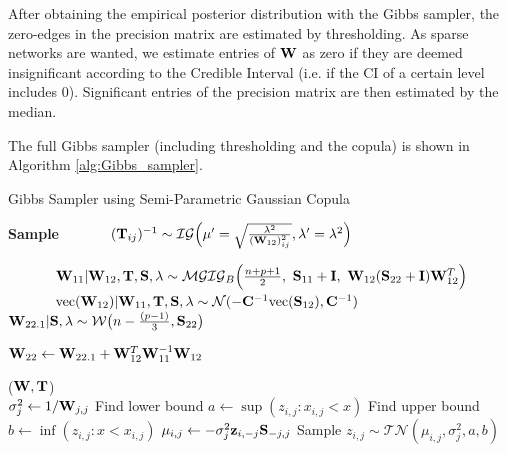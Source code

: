 After obtaining the empirical posterior distribution with the Gibbs sampler, the zero-edges in the precision matrix are estimated by thresholding.
As sparse networks are wanted, we estimate entries of $\mathbf{W}$ as zero if they are deemed insignificant according to the Credible Interval (i.e. if the \gls{CI} of a certain level includes 0).
Significant entries of the precision matrix are then estimated by the median.

The full Gibbs sampler (including thresholding and the copula) is shown in Algorithm \autoref{alg:Gibbs_sampler}.

\begin{algorithm}[H]
	\caption{Gibbs Sampler using Semi-Parametric Gaussian Copula}\label{alg:Gibbs_sampler}
	
	{\fontsize{9}{12}\selectfont\begin{algorithmic}
				\State
				\textbf{Sample}		
				\State {}$\qquad\quad$
				$ 				(\mathbf{T}_{ij})^{-1} \sim \mathcal{IG}
				\Big(
				\mu' = \sqrt{
					\frac{\lambda^2}{(\mathbf{W}_{12})_{ij}^2}
				},
				\lambda' = \lambda^2
				\Big) $
				
				\State $\qquad\quad$
				$				\matr{W}_{11} | \matr{W}_{12}, \matr{T}, \matr{S}, \lambda \sim 
				\mathcal{MGIG}_B
				\Big(
				\frac{n+p+1}{2}, \ 
				\matr{S}_{11}+\matr{I},\  
				\matr{W}_{12}(\matr{S}_{22}+\matr{I})\matr{W}_{12}^T
				\Big)$
				\State $\qquad\quad$
				$ \text{vec}(\mathbf{W}_{12}) | \mathbf{W}_{11}, \mathbf{T}, \mathbf{S}, \lambda \sim \mathcal{N}(-\mathbf{C}^{-1} \text{vec}(\mathbf{S}_{12}), \mathbf{C}^{-1}) $
				\State $\qquad\quad$
				$
				\mathbf{W}_{22.1} | \mathbf{S}, \lambda \sim \mathcal{W}\big(n-\frac{(p-1)}{3}, \mathbf{S}_{22}\big)
				$

				\State
				$
				\mathbf{W}_{22} \gets \mathbf{W}_{22.1} + \mathbf{W}_{12}^T \mathbf{W}_{11}^{-1} \mathbf{W}_{12}
				$
				
				\State
				\Return($\mathbf{W}, \mathbf{T}$)
				\EndFunction
				\\
				
				\State $\sigma^2_j \gets 1/\mathbf{W}_{j,j}$
				\State Find lower bound $a \gets \sup(z_{i,j} : x_{i,j} < x)$
				\State Find upper bound $b \gets \inf(z_{i,j} : x<x_{i,j})$
				\For{each $i$ such that $x_{i,j}=x$}
				\State $\mu_{i,j} \gets -\sigma_j^2 \mathbf{z}_{i,-j}\mathbf{S}_{-j,j}$
				\State Sample $z_{i,j} \sim \mathcal{TN}(\mu_{i,j}, \sigma_j^2, a, b)$
				\EndFor
				\EndFor
				\EndFor
				

\end{algorithmic}}
\end{algorithm}
